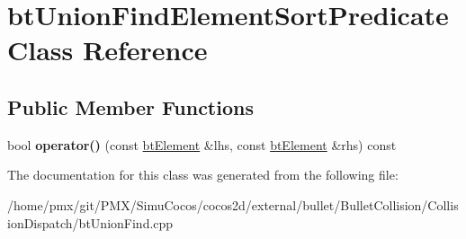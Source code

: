 \hypertarget{classbtUnionFindElementSortPredicate}{}\section{bt\+Union\+Find\+Element\+Sort\+Predicate Class Reference}
\label{classbtUnionFindElementSortPredicate}
\subsection*{Public Member Functions}
\begin{DoxyCompactItemize}
\item 
\mbox{\label{classbtUnionFindElementSortPredicate_a02a03a1f9e5dd3e2143739d8846088fc}} 
bool {\bfseries operator()} (const \hyperlink{structbtElement}{bt\+Element} \&lhs, const \hyperlink{structbtElement}{bt\+Element} \&rhs) const
\end{DoxyCompactItemize}


The documentation for this class was generated from the following file\+:\begin{DoxyCompactItemize}
\item 
/home/pmx/git/\+P\+M\+X/\+Simu\+Cocos/cocos2d/external/bullet/\+Bullet\+Collision/\+Collision\+Dispatch/bt\+Union\+Find.\+cpp\end{DoxyCompactItemize}
